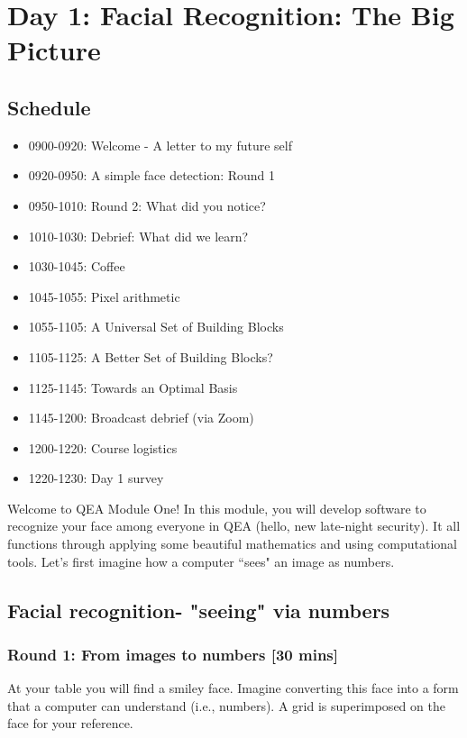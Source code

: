 \chapter{Day 1: Facial Recognition: The Big Picture}

\section{Schedule}
\begin{itemize}
\item 0900-0920: Welcome - A letter to my future self
\item 0920-0950: A simple face detection: Round 1
\item 0950-1010: Round 2: What did you notice?
\item 1010-1030: Debrief: What did we learn?
\item 1030-1045: Coffee
\item 1045-1055: Pixel arithmetic
\item 1055-1105: A Universal Set of Building Blocks
\item 1105-1125: A Better Set of Building Blocks?
\item 1125-1145: Towards an Optimal Basis
\item 1145-1200: Broadcast debrief (via Zoom)
\item 1200-1220: Course logistics 
\item 1220-1230: Day 1 survey
\end{itemize}

Welcome to QEA Module One! In this module, you will develop software to recognize your face among everyone in QEA (hello, new late-night security). It all functions through applying some beautiful mathematics and using computational tools. Let's first imagine how a computer ``sees" an image as numbers. 

\section{Facial recognition- "seeing" via numbers} 

\subsection{Round 1: From images to numbers [30 mins]}
At your table you will find a smiley face. Imagine converting this face into a form that a computer can understand (i.e., numbers). A grid is superimposed on the face for your reference. 

